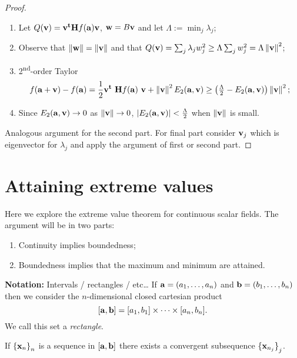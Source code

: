 \begin{proof}
    \begin{enumerate}
        \item Let \(Q(\vv) =  \vv^{\mathbf{t}} \mathbf{H} f (\aa) \vv  \),  \(\ww = B \vv\) and let \(\Lambda := \min_j \lambda_j\);
        \item Observe that \(\norm{\ww} =  \norm{\vv}\) and that \(Q(\vv)=  \sum_{j} \lambda_j w_j^2  \geq \Lambda \sum_{j} w_j^2 = \Lambda  \norm{\vv}^2 \);
        \item 2\textsuperscript{nd}-order Taylor
              \vspace{-1em}
              \[
                  f(\aa+\vv) - f(\aa)
                  =  \frac{1}{2} \vv^{\mathbf{t}} \ \mathbf{H} f (\aa) \ \vv + \norm{\vv}^2 E_2(\aa,\vv)
                  \geq  \left(\tfrac{\Lambda}{2} - E_2(\aa,\vv) \right) \norm{\vv}^2;
              \]
        \item Since \(E_2(\aa,\vv) \to 0\) as \(\norm{\vv}\to 0\), \(\abs{E_2(\aa,\vv)} < \tfrac{\Lambda}{2}\) when \(\norm{\vv}\) is small.
    \end{enumerate}
    Analogous argument for the second part. For final part consider \(\vv_j\) which is eigenvector for \(\lambda_j\) and apply the argument of first or second part.
\end{proof}



\section{Attaining extreme values}

Here we explore the extreme value theorem for continuous scalar fields.
The argument will be in two parts:
\begin{enumerate}
    \item Continuity implies boundedness;
    \item Boundedness implies that the maximum and minimum are attained.
\end{enumerate}

\textbf{Notation:}
Intervals / rectangles / etc\ldots
If \(\aa = (a_1,\ldots,a_n)\) and  \(\bb = (b_1,\ldots,b_n)\)
then we consider the \(n\)-dimensional closed cartesian product
\[
    [\aa,\bb] = [a_1,b_1] \times \cdots \times [a_n,b_n].
\]
We call this set a \emph{rectangle}.




\begin{theorem}
    If \({\{\xx_{n}\}}_{n}\) is a sequence in \( [\aa,\bb]\)
    there exists a convergent subsequence \({\{\xx_{n_j}\}}_{j}\).
\end{theorem}

